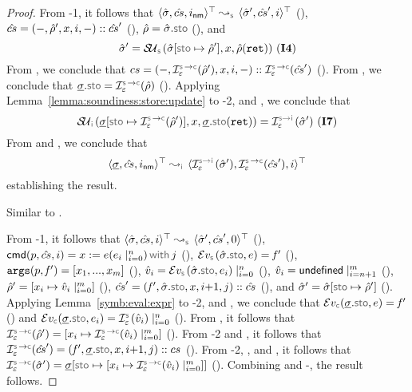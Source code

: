 \begin{proof}
\noindent {}
From \hyp{1}, it follows that $\abssemrule{\sstate, \scs, \retlab}{\sstate', \scs', i}{\top}{\top}{\symbolic}$ (), 
$\hat{cs} = (-, \hat\rho', x, i, -) :: \hat{cs}'$ (), $\sstore = \sstate.\stosel$ (), 
and 
$$\sstate' = \stupdt{\symbolic}(\sstate[\stosel \mapsto \sstore'], \jvar, \sstore(\retvar)) \text{ (\ieq{4})}$$
From , we conclude that $\cs = (-, \interpret{\symbconc}{\senv}(\sstore'), \jvar, i, -) :: \interpret{\symbconc}{\senv}(\scs')$ (). 
From , we conclude that $\istate.\stosel = \interpret{\symbconc}{\senv}(\sstore)$ (). 
Applying Lemma~\ref{lemma:soundiness:store:update} to \hyp{2},  and , we conclude that 
$$
\stupdt{\instrumented}(\istate[\stosel \mapsto \interpret{\symbconc}{\senv}(\sstore')], \jvar, \istate.\stosel(\retvar)) = \interpret{\symbinst}{\senv}(\sstate')
 \text{ (\ieq{7})}
$$ 
From  and , we conclude that 
$$\abssemrule{\istate, \scs, \retlab}{\interpret{\symbinst}{\senv}(\sstate'), \interpret{\symbconc}{\senv}(\scs'), i}{\top}{\top}{\instrumented}$$ 
establishing the result. 
 \vspace{5pt}

\noindent {}
Similar to . 
 \vspace{5pt}


\noindent {}
From \hyp{1}, it follows that $\abssemrule{\sstate, \scs, i}{\sstate', \scs', 0}{\top}{\top}{\symbolic}$ (), 
$\ccmd[\prog][\scs]{i} =   \jsilcall{\jvar}{\jsilexpr}{\jsilexpr_i \mid_{i = 0}^{n}}{j}$ (), 
$\evalexpr{\symbolic}(\sstate.\stosel, \jsilexpr) =  \pid'$ (), 
$\mathtt{args}(p, \mathit{f}') = [ x_1, ..., x_{m} ]$ (), 
$\sexprv_i = \evalexpr{\symbolic}(\sstate.\stosel, \jsilexpr_i) \mid_{i = 0}^{n}$ (), 
$\hat{v}_i = {\sf undefined} \mid_{i = n+1}^{m}$ (), 
$\hat\rho' = [x_i \mapsto \hat{v}_i \mid_{i = 0}^{m}]$ (),  
$\scs' = (\pid', \sstate.\stosel, \jvar, i{+}1, j) :: \scs$ (), and 
$\sstate' = \sstate[\stosel \mapsto \sstore']$ (). 
Applying Lemma~\ref{symb:eval:expr} to \hyp{2},  and , we conclude that 
$\evalexpr{\concrete}(\istate.\stosel, \jsilexpr) =  \pid'$ () 
and 
$\evalexpr{\concrete}(\istate.\stosel, \jsilexpr_i) = \interpret{\symbolic}{\senv}(\sexprv_i) \mid_{i = 0}^{n}$ (). 
From , it follows that $\interpret{\symbconc}{\senv}(\sstore') = [\jvar_i \mapsto \interpret{\symbconc}{\senv}(\sexprv_i) \mid_{i = 0}^{m}]$ (). 
From \hyp{2} and , it follows that $\interpret{\symbconc}{\senv}(\scs') = (\pid', \istate.\stosel, \jvar, i{+}1, j) :: \cs$ ().
From \hyp{2}, , and , it follows that 
$\interpret{\symbconc}{\senv}(\sstate') = \istate[\stosel \mapsto  [\jvar_i \mapsto \interpret{\symbconc}{\senv}(\sexprv_i) \mid_{i = 0}^{m}]]$ (). 
Combining  and -, the result follows. 
\vspace{5pt}


\end{proof}
